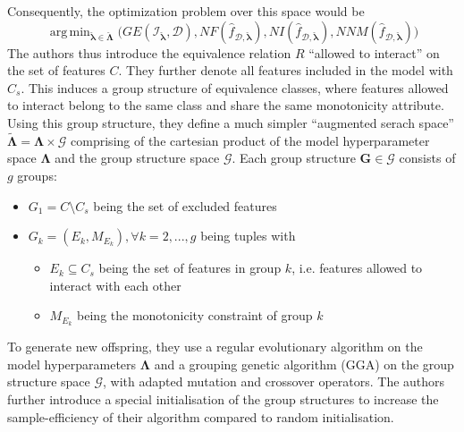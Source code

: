 \documentclass[twoside,11pt]{article}
\DeclareMathOperator*{\argmin}{arg\,min}
\begin{document}
Consequently, the optimization problem over this space would be
\begin{equation}
  \argmin_{\check{\boldsymbol\lambda}\in\check{\boldsymbol\Lambda}} \big(
    GE(\mathcal{I}_{\check{\boldsymbol\lambda}},\mathcal{D}),
    NF(\hat{f}_{\mathcal{D},\check{\boldsymbol\lambda}}),
    NI(\hat{f}_{\mathcal{D},\check{\boldsymbol\lambda}}),
    NNM(\hat{f}_{\mathcal{D},\check{\boldsymbol\lambda}})
  \big)
  \label{eq-eagga-extended-space}
\end{equation}
The authors thus introduce the equivalence relation $R$ ``allowed to interact'' on the set of features $C$. They further denote all features included in the model with $C_s$.
This induces a group structure of equivalence classes, where features allowed to interact belong to the same class and share the same monotonicity attribute.
Using this group structure, they define a much simpler ``augmented serach space'' $\tilde{\boldsymbol\Lambda}=\boldsymbol\Lambda\times\mathcal{G}$ comprising of
the cartesian product of the model hyperparameter space $\boldsymbol\Lambda$ and the group structure space $\mathcal{G}$.
Each group structure $\boldsymbol{G}\in\mathcal{G}$ consists of $g$ groups:
\begin{itemize}
  \item $G_1=C\setminus C_s$ being the set of excluded features
  \item $G_k=(E_k,M_{E_k}), \forall k=2,...,g$ being tuples with
  \begin{itemize}
    \item $E_k\subseteq C_s$ being the set of features in group $k$, i.e. features allowed to interact with each other
    \item $M_{E_k}$ being the monotonicity constraint of group $k$
  \end{itemize}
\end{itemize}
To generate new offspring, they use a regular evolutionary algorithm on the model hyperparameters $\boldsymbol\Lambda$ and a grouping genetic algorithm (GGA) on
the group structure space $\mathcal{G}$, with adapted mutation and crossover operators.
The authors further introduce a special initialisation of the group structures to increase the sample-efficiency of their algorithm compared to random initialisation.
\citep[pp. 541-543]{EAGGA}
\end{document}
